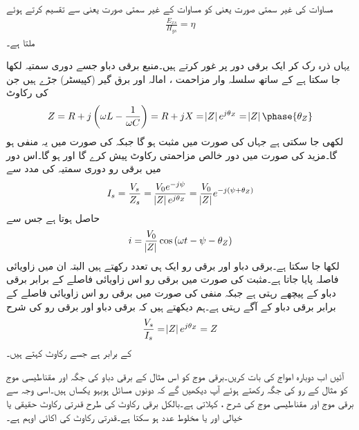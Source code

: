 مساوات  کی غیر سمتی صورت یعنی  کو مساوات  کے غیر سمتی صورت یعنی  سے تقسیم کرتے ہوئے
\begin{align}
\frac{E_{xs}}{H_{ys}}=\eta
\end{align}
ملتا ہے۔

یہاں ذرہ رک کر ایک برقی دور پر غور کرتے ہیں۔منبع برقی دباو  جسے دوری سمتیہ  لکھا جا سکتا ہے کے ساتھ سلسلہ وار مزاحمت ، امالہ  اور برق گیر (کپیسٹر)   جڑے ہیں جن کی رکاوٹ 
\begin{align*}
Z=R+j\left( \omega L -\frac{1}{\omega C}\right)=R+jX=\abs{Z} e^{j \theta_Z}=\abs{Z}\phase{\theta_Z}
\end{align*}
لکھی جا سکتی ہے  جہاں  کی صورت میں  مثبت ہو گا جبکہ  کی صورت میں یہ منفی ہو گا۔مزید  کی صورت میں دور خالص مزاحمتی رکاوٹ پیش کرے گا اور  ہو گا۔اس دور میں برقی رو دوری سمتیہ کی مدد سے
\begin{align*}
I_s=\frac{V_s}{Z_s}=\frac{V_0 e^{-j\psi}}{\abs{Z}e^{j \theta_Z}}=\frac{V_0}{\abs{Z}}e^{-j(\psi+\theta_Z)}
\end{align*}
حاصل ہوتا ہے جس سے
\begin{align*}
i=\frac{V_0}{\abs{Z}}\cos \left(\omega t -\psi-\theta_Z \right)
\end{align*}
لکھا جا سکتا ہے۔برقی دباو اور برقی رو ایک ہی تعدد رکھتے ہیں البتہ ان میں زاویائی فاصلہ  پایا جاتا ہے۔مثبت  کی صورت میں برقی رو اس زاویائی فاصلے کے برابر برقی دباو کے پیچھے رہتی ہے جبکہ منفی  کی صورت میں برقی رو اس زاویائی فاصلے کے برابر برقی دباو کے آگے رہتی ہے۔ہم دیکھتے ہیں کہ برقی دباو اور برقی رو کی شرح
\begin{align*}
\frac{V_s}{I_s}=\abs{Z} e^{j \theta_Z}=Z
\end{align*}
کے برابر ہے جسے رکاوٹ کہتے ہیں۔

آئیں اب دوبارہ امواج کی بات کریں۔برقی موج کو اس مثال کے برقی دباو کی جگہ اور مقناطیسی موج کو مثال کے رو کی جگہ رکھتے ہوئے آپ دیکھیں گے کہ دونوں مسائل ہوبہو یکساں ہیں۔اسی وجہ سے  برقی موج  اور مقناطیسی موج  کی شرح ،   کہلاتی ہے۔بالکل برقی رکاوٹ کی طرح قدرتی رکاوٹ حقیقی یا خیالی اور یا مخلوط عدد ہو سکتا ہے۔قدرتی رکاوٹ کی اکائی اوہم  ہے۔

